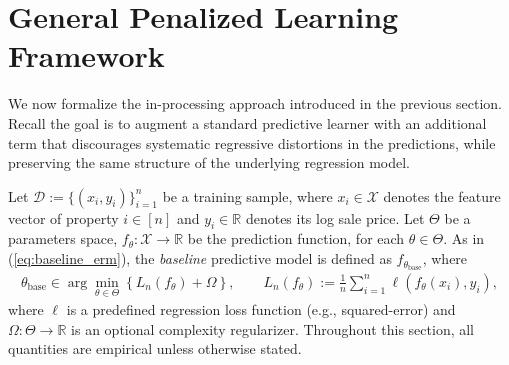 \documentclass[12pt, draft]{article}
\theoremstyle{plain}
\theoremstyle{definition}
\newcommand{\R}{\mathbb{R}}
\newcommand{\1}{\mathbf{1}}
\newcommand{\X}{\mathcal{X}}
\newcommand{\D}{\mathcal{D}}
\renewcommand{\R}{\mathbb{R}}
\begin{document}









\section{General Penalized Learning Framework}

We now formalize the in-processing approach introduced in the previous section. Recall the goal is to augment a standard predictive learner with an additional term that discourages systematic regressive distortions in the predictions, while preserving the same structure of the underlying regression model.

Let $\D := \{(x_i,y_i)\}_{i=1}^n$ be a training sample, where $x_i \in \X$ denotes the feature vector of property $i \in [n]$ and $y_i \in \R$ denotes its log sale price. Let $\Theta$ be a parameters space, $f_\theta:\X \to \R$ be the prediction function, for each $\theta \in \Theta$. As in (\ref{eq:baseline_erm}), the \textit{baseline} predictive model is defined as $f_{\theta_\mathrm{base}}$, where
\begin{align}
    \label{opt:base_model}
    \theta_{\mathrm{base}}
    \in
    \arg\min_{\theta \in \Theta}
    \left\{
        L_n(f_\theta) + \Omega
    \right\},
    \qquad
    L_n(f_\theta) := \frac{1}{n}\sum_{i=1}^n \ell(f_\theta(x_i),y_i),
\end{align}
where $\ell$ is a predefined regression loss function (e.g., squared-error) and $\Omega:\Theta \to \R$ is an optional complexity regularizer. Throughout this section, all quantities are empirical unless otherwise stated.
\end{document}
